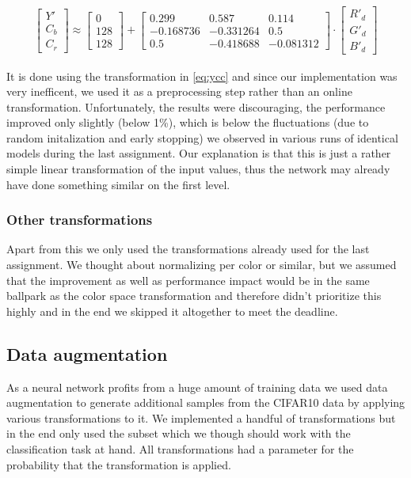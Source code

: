 \begin{align}
\left[\begin{array}{c}Y' \\ C_b \\ C_r\end{array}\right]
\approx
\left[\begin{array}{c}0  \\ 128 \\ 128\end{array}\right]
+
\left[\begin{array}{ccc} 0.299 & 0.587 & 0.114\\ -0.168736 & -0.331264 & 0.5  \\ 0.5 & -0.418688 & -0.081312\end{array}\right]
\cdot
\left[\begin{array}{c}R'_d \\ G'_d \\ B'_d\end{array}\right]\label{eq:ycc}
\end{align}

It is done using the transformation in \eqref{eq:ycc} and since our implementation was very inefficent, we used it as a preprocessing step rather than an online transformation. 
Unfortunately, the results were discouraging, the performance improved only slightly (below 1\%), which is below the fluctuations (due to random initalization and early stopping) we observed in various runs of identical models during the last assignment. Our explanation is that this is just a rather simple linear transformation of the input values, thus the network may already have done something similar on the first level. 



\subsubsection{Other transformations}
Apart from this we only used the transformations already used for the last assignment. We thought about normalizing per color or similar, but we assumed that the improvement as well as performance impact would be in the same ballpark as the color space transformation and therefore didn't prioritize this highly and in the end we skipped it altogether to meet the deadline.


\subsection{Data augmentation}
As a neural network profits from a huge amount of training data we used data augmentation to generate additional samples from the CIFAR10 data by applying various transformations to it. We implemented a handful of transformations but in the end only used the subset which we though should work with the classification task at hand. All transformations had a parameter  for the probability that the transformation is applied. 
